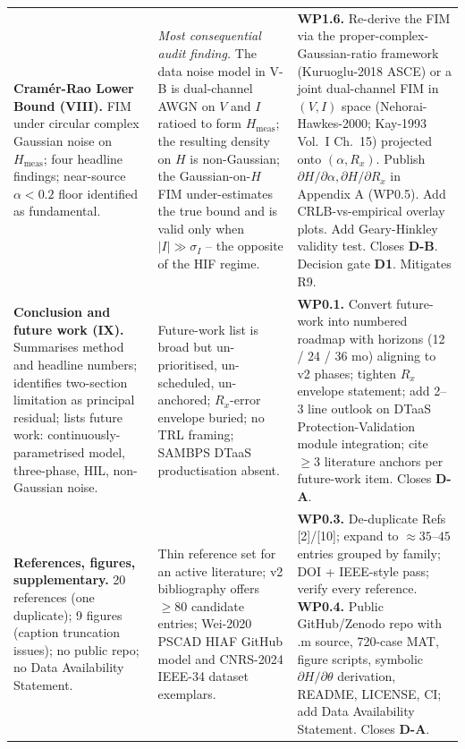 \documentclass[11pt,a4paper]{article}
\begin{document}
\begin{longtable}{L{4.4cm}L{4.6cm}L{6.0cm}}
\textbf{Cram\'er-Rao Lower Bound (VIII).}
FIM under circular complex Gaussian noise on $H_{\mathrm{meas}}$;
four headline findings; near-source $\alpha < 0.2$ floor identified
as fundamental.
&
\emph{Most consequential audit finding.} The data noise model in V-B is
dual-channel AWGN on $V$ and $I$ ratioed to form $H_{\mathrm{meas}}$;
the resulting density on $H$ is non-Gaussian; the Gaussian-on-$H$ FIM
under-estimates the true bound and is valid only when
$|I|\gg \sigma_I$ -- the opposite of the HIF regime.
&
\textbf{WP1.6.} Re-derive the FIM via the proper-complex-Gaussian-ratio
framework (Kuruoglu-2018 ASCE) or a joint dual-channel FIM in $(V, I)$
space (Nehorai-Hawkes-2000; Kay-1993 Vol.~I Ch.~15) projected onto
$(\alpha, R_x)$.  Publish $\partial H/\partial\alpha,
\partial H/\partial R_x$ in Appendix A (WP0.5).  Add CRLB-vs-empirical
overlay plots.  Add Geary-Hinkley validity test.  Closes \textbf{D-B}.
Decision gate \textbf{D1}.  Mitigates R9.\\

\textbf{Conclusion and future work (IX).}
Summarises method and headline numbers; identifies two-section limitation
as principal residual; lists future work: continuously-parametrised model,
three-phase, HIL, non-Gaussian noise.
&
Future-work list is broad but un-prioritised, un-scheduled, un-anchored;
$R_x$-error envelope buried; no TRL framing; SAMBPS DTaaS productisation
absent.
&
\textbf{WP0.1.} Convert future-work into numbered roadmap with horizons
(12 / 24 / 36 mo) aligning to v2 phases; tighten $R_x$ envelope
statement; add 2--3 line outlook on DTaaS Protection-Validation module
integration; cite $\geq 3$ literature anchors per future-work item.
Closes \textbf{D-A}.\\

\textbf{References, figures, supplementary.}
20 references (one duplicate); 9 figures (caption truncation issues);
no public repo; no Data Availability Statement.
&
Thin reference set for an active literature; v2 bibliography offers
$\geq 80$ candidate entries; Wei-2020 PSCAD HIAF GitHub model and
CNRS-2024 IEEE-34 dataset exemplars.
&
\textbf{WP0.3.} De-duplicate Refs [2]/[10]; expand to $\approx 35$--$45$
entries grouped by family; DOI + IEEE-style pass; verify every reference.
\textbf{WP0.4.} Public GitHub/Zenodo repo with .m source, 720-case MAT,
figure scripts, symbolic $\partial H/\partial\theta$ derivation, README,
LICENSE, CI; add Data Availability Statement.  Closes \textbf{D-A}.\\

\bottomrule
\end{longtable}
\end{document}
